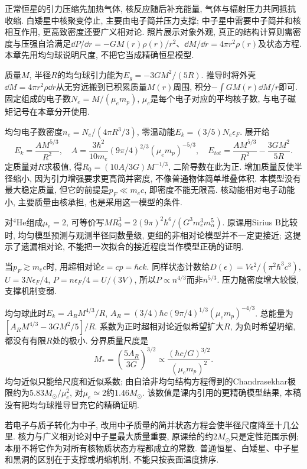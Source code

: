 \par{}
\label{ch:stars}
正常恒星的引力压缩先加热气体, 核反应随后补充能量, 气体与辐射压力共同抵抗收缩. 白矮星中核聚变停止, 主要由电子简并压力支撑; 中子星中需要中子简并和核相互作用, 更高致密度还要广义相对论. 照片展示对象外观, 真正的结构计算则需密度与压强自洽满足$\dd P/\dd r=-GM(r)\rho(r)/r^2$、$\dd M/\dd r=4\pi r^2\rho(r)$及状态方程. 本章先用均匀球说明尺度, 不把它当成精确恒星模型.

质量$M$, 半径$R$的均匀球引力能为$E_g=-3GM^2/(5R)$. 推导时将外壳$\dd M=4\pi r^2\rho\dd r$从无穷远搬到已积累质量$M(r)$周围, 积分$-\int GM(r)\dd M/r$即可. 固定组成的电子数$N_e=M/(\mu_e m_p)$, $\mu_e$是每个电子对应的平均核子数, 与电子磁矩记号在本章分开使用.

均匀电子数密度$n_e=N_e/(4\pi R^3/3)$, 零温动能$E_k=(3/5)N_e\epsilon_F$. 展开给
\[
E_k=\frac{A M^{5/3}}{R^2},\quad
A=\frac{3\hbar^2}{10m_e}(9\pi/4)^{2/3}(\mu_em_p)^{-5/3},
\quad E_{tot}=\frac{AM^{5/3}}{R^2}-\frac{3GM^2}{5R}.
\]
定质量对$R$求极值, 得$R_0=(10A/3G)M^{-1/3}$, 二阶导数在此为正. 增加质量反使半径缩小, 因为引力增强要求更高简并密度, 不像普通物体简单堆叠体积. 本模型没有最大稳定质量, 但它的前提是$p_F\ll m_ec$, 即密度不能无限高. 核动能相对电子动能小, 主要质量由核承担, 也是采用这一模型的条件.

对${}^4$He组成$\mu_e=2$, 可等价写$MR_0^3=2(9\pi)^2\hbar^6/(G^3m_e^3m_\alpha^5)$. 原课用Sirius B比较时, 均匀模型预测与观测半径同数量级, 更细的非相对论模型并不一定更接近; 这提示了遗漏相对论, 不能把一次拟合的接近程度当作模型正确的证明.

当$p_F\gtrsim m_ec$时, 用超相对论$\epsilon=cp=\hbar ck$. 同样状态计数给$D(\epsilon)=V\epsilon^2/(\pi^2\hbar^3c^3)$, $U=3N\epsilon_F/4$, $P=n\epsilon_F/4=U/(3V)$, 所以$P\propto n^{4/3}$而非$n^{5/3}$. 压力随密度增大较慢, 支撑机制变弱.

均匀球此时$E_k=A_RM^{4/3}/R$, $A_R=(3/4)\hbar c(9\pi/4)^{1/3}(\mu_em_p)^{-4/3}$. 总能量为$[A_RM^{4/3}-3GM^2/5]/R$. 系数为正时超相对论近似希望扩大$R$, 为负时希望坍缩, 都没有有限$R$处的极小. 分界质量尺度是
\[
M_*=\left(\frac{5A_R}{3G}\right)^{3/2}
\propto\frac{(\hbar c/G)^{3/2}}{(\mu_em_p)^2}.
\]
均匀近似只能给尺度和近似系数; 由自洽非均匀结构方程得到的Chandrasekhar极限约为$5.83M_\odot/\mu_e^2$, 对$\mu_e\simeq2$约$1.46M_\odot$. 该数值是课内引用的更精确模型结果, 本稿没有把均匀球推导冒充它的精确证明.

若电子与质子转化为中子, 改用中子质量的简并状态方程会使半径尺度降至十几公里. 核力与广义相对论对中子星最大质量重要, 原课给的约$2M_\odot$只是定性范围示例; 本册不将它作为对所有核物质状态方程都成立的常数. 普通恒星、白矮星、中子星和黑洞的区别在于支撑或坍缩机制, 不能只按表面温度排序.
